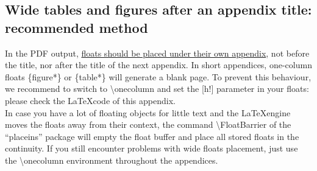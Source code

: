 \documentclass{aa}
\begin{document}
\begin{appendix}





\onecolumn
\section{Wide tables and figures after an appendix title: recommended method}
%

In the PDF output, \underline{floats should be placed
under their own appendix}, not before the title, nor after the
title of the next appendix. In short appendices, one-column floats
\{figure*\} or \{table*\} will generate
a blank page. To prevent this behaviour, we recommend to switch
to \textbackslash onecolumn and set the [h!] parameter 
in your floats: please check the \LaTeX code of this appendix.\\

In case you have a lot of floating objects for little text and the 
\LaTeX engine moves the floats away from their context, the command
\textbackslash FloatBarrier of the “placeins” package will empty the
float buffer and place all stored floats in the continuity. If you still encounter problems with wide floats placement, just use the \textbackslash onecolumn
environment throughout the appendices.



\end{appendix}
\end{document}
